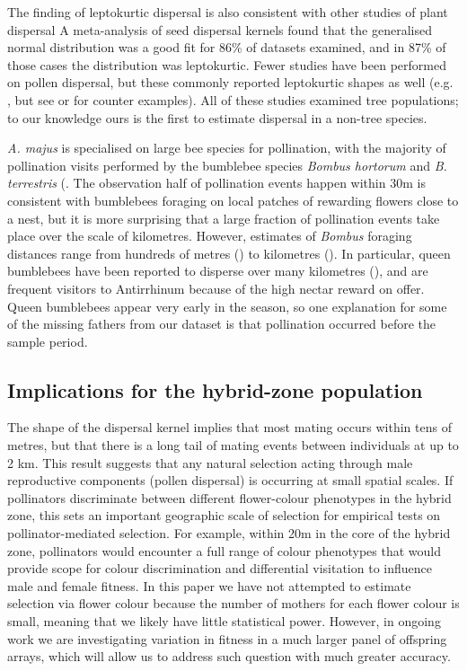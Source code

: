 \documentclass[10pt, a4paper, twocolumn]{article} %
\begin{document}
The finding of leptokurtic dispersal is also consistent with other studies of plant dispersal
A meta-analysis of seed dispersal kernels found that the generalised normal distribution was a good fit for 86\% of datasets examined, and in 87\% of those cases the distribution was leptokurtic.
Fewer studies have been performed on pollen dispersal, but these commonly reported leptokurtic shapes as well (e.g. \cite{adams1992using, austerlitz2004using, robledo2005patterns, klein2008pollen, burczyk2019patterns}, but see \cite{field2011importance} or \cite{ottewell2012pollen} for counter examples).
All of these studies examined tree populations; to our knowledge ours is the first to estimate dispersal in a non-tree species.

\textit{A. majus} is specialised on large bee species for pollination, with the majority of pollination visits performed by the bumblebee species \textit{Bombus hortorum} and \textit{B. terrestris} (\cite{vargas2010occluded, andalo2019prevalence}.
The observation half of pollination events happen within 30m is consistent with bumblebees foraging on local patches of rewarding flowers close to a nest, but it is more surprising that a large fraction of pollination events take place over the scale of kilometres.
However, estimates of \textit{Bombus} foraging distances range from hundreds of metres (\cite{osborne1999landscape, wolf2008foraging}) to kilometres (\cite{osborne2008bumblebee, hagen2011space}).
In particular, queen bumblebees have been reported to disperse over many kilometres (\cite{lepais2010estimation}), and are frequent visitors to Antirrhinum because of the high nectar reward on offer.
Queen bumblebees appear very early in the season, so one explanation for some of the missing fathers from our dataset is that pollination occurred before the sample period.

\subsection{Implications for the hybrid-zone population}

The shape of the dispersal kernel implies that most mating occurs within tens of metres, but that there is a long tail of mating events between individuals at up to 2 km. This result suggests that any natural selection acting through male reproductive components (pollen dispersal) is occurring at small spatial scales. If pollinators discriminate between different flower-colour phenotypes in the hybrid zone, this sets an important geographic scale of selection for empirical tests on pollinator-mediated selection. For example, within 20m in the core of the hybrid zone, pollinators would encounter a full range of colour phenotypes that would provide scope for colour discrimination and differential visitation to influence male and female fitness. In this paper we have not attempted to estimate selection via flower colour because the number of mothers for each flower colour is small, meaning that we likely have little statistical power. However, in ongoing work we are investigating variation in fitness in a much larger panel of offspring arrays, which will allow us to address such question with much greater accuracy.
\end{document}
